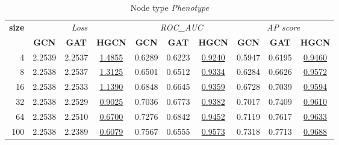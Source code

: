 \begin{table}
    \begin{subtable}[t]{\textwidth}
        \centering
        \begin{tabular}{r|ccc|ccc|ccc}   
        \toprule
            \multirow{2}{*}{\textbf{size}} & \multicolumn{3}{c|}{\textit{Loss}} & \multicolumn{3}{c|}{\textit{ROC\_AUC}} & \multicolumn{3}{c}{\textit{AP score}} \\
                & \textbf{GCN} & \textbf{GAT} & \textbf{HGCN} & \textbf{GCN} & \textbf{GAT} & \textbf{HGCN} & \textbf{GCN} & \textbf{GAT} & \textbf{HGCN} \\
            \midrule
            4 & 2.2539 & 2.2537 & \underline{1.4855} & 0.6289 & 0.6223 & \underline{0.9240} & 0.5947 & 0.6195 & \underline{0.9460} \\
            8 & 2.2538 & 2.2537 & \underline{1.3125} & 0.6501 & 0.6512 & \underline{0.9334} & 0.6284 & 0.6626 & \underline{0.9572} \\
            16 & 2.2538 & 2.2533 & \underline{1.1390} & 0.6848 & 0.6645 & \underline{0.9359} & 0.6728 & 0.7039 & \underline{0.9594} \\
            32 & 2.2538 & 2.2529 & \underline{0.9025} & 0.7036 & 0.6773 & \underline{0.9382} & 0.7017 & 0.7409 & \underline{0.9610} \\
            64 & 2.2538 & 2.2510 & \underline{0.6700} & 0.7276 & 0.6842 & \underline{0.9452} & 0.7119 & 0.7617 & \underline{0.9633} \\
            100 & 2.2538 & 2.2389 & \underline{0.6079} & 0.7567 & 0.6555 & \underline{0.9573} & 0.7318 & 0.7713 & \underline{0.9688} \\
            \bottomrule
        \end{tabular}
        \caption{Node type \textit{Phenotype}}
    \end{subtable}
\end{table}
